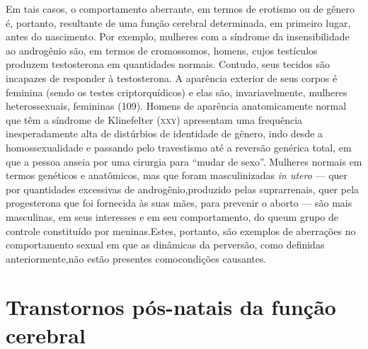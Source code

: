 Em tais casos, o comportamento aberrante, em termos de erotismo ou
de gênero é, portanto, resultante de uma função cerebral determinada,
em primeiro lugar, antes do nascimento. Por exemplo, mulheres com a
síndrome da insensibilidade ao androgênio\idxandrs{} são, em termos de
cromossomos, homens, cujos testículos produzem testosterona em
quantidades normais. Contudo, seus tecidos são incapazes de responder à
testosterona. A aparência exterior de seus corpos é feminina (sendo os
testes criptorquídicos) e elas são, invariavelmente, mulheres
heterossexuais, femininas (109). Homens de aparência anatomicamente
normal que têm a síndrome de Klinefelter\idxkline{} (\textsc{xxy}) apresentam uma
frequência inesperadamente alta de distúrbios de identidade de gênero,
indo desde a homossexualidade\idxhomos{} e passando pelo travestismo\idxtrave{} até a
reversão genérica total, em que a pessoa anseia por uma cirurgia para
``mudar de sexo''. Mulheres normais em termos genéticos e anatômicos, mas
que foram masculinizadas \textit{in utero} --- quer por quantidades
excessivas de androgênio,\idxandrn[|)] produzido pelas suprarrenais, quer pela
progesterona que foi fornecida às suas mães, para prevenir o aborto ---
são mais masculinas, em seus interesses e em seu comportamento, do que\idxprenat[|)]
um grupo de controle constituído por meninas.\idxanimdese[|)] Estes, portanto, são
exemplos de aberrações no comportamento sexual em que as dinâmicas da
perversão, como definidas anteriormente,\idxhormdese[|)] não estão presentes como\idxidenpre[|)]
condições causantes.




\section{Transtornos pós-natais da função cerebral}

